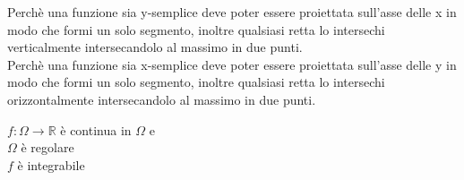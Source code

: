 \documentclass[a4paper, oneside]{article}
\begin{document}
Perchè una funzione sia y-semplice deve poter essere proiettata sull'asse delle x in modo che formi un solo segmento, inoltre qualsiasi retta lo intersechi verticalmente intersecandolo al massimo in due punti.\\
Perchè una funzione sia x-semplice deve poter essere proiettata sull'asse delle y in modo che formi un solo segmento, inoltre qualsiasi retta lo intersechi orizzontalmente intersecandolo al massimo in due punti.\\
\begin{example}
    
\end{example}
\begin{theorem}
     $f:\Omega \to \mathbb{R}$ è continua in $\Omega$ e\\
     $\Omega$ è regolare\\
     $f$ è integrabile
    \begin{center}
    \end{center}
\end{theorem}
\end{document}
